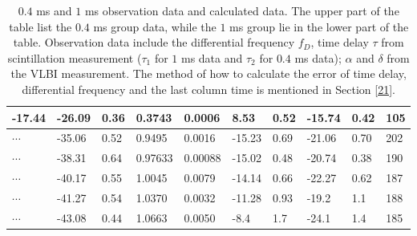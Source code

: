 \documentclass[useAMS,usenatbib]{mn2e}
\begin{document}
\begin{table}
\begin{tabular}{llllllllll}
-17.44   &-26.09                            & 0.36      & 0.3743 & 0.0006         & 8.53    & 0.52                                     & -15.74    & 0.42      &105                               
\\ \hline
$\cdots$&         -35.06                           & 0.52                               & 0.9495               & 0.0016                              & -15.23  & 0.69                                     & -21.06   & 0.70   &202                                   \\

$\cdots$ & -38.31                           & 0.64                               & 0.97633              & 0.00088                             & -15.02  & 0.48                                    & -20.74   & 0.38  &190                                    \\
$\cdots$ & -40.17                           & 0.55                               & 1.0045              & 0.0079                             & -14.14  & 0.66                                    & -22.27   & 0.62  &187                                   \\

$\cdots$ & -41.27                           & 0.54                               & 1.0370              & 0.0032                              & -11.28  & 0.93                                     & -19.2   & 1.1   &188                                   \\

$ \cdots$ & -43.08                           & 0.44                               & 1.0663              & 0.0050                              & -8.4   & 1.7                                      & -24.1   & 1.4   &185   \\
 \hline                                 
\end{tabular}
\caption{ $0.4$ ms and $1$ ms observation data and calculated data. 
The upper part of the table list the $0.4$ ms group data, while the $1$ ms group lie in the lower part of the table. 
Observation data include the differential frequency $f_D$, time delay $\tau$ from scintillation measurement ($\tau_1$ for $1$ ms data and $\tau_2$ for $0.4$ ms data); $\alpha$ and $\delta$ from the VLBI measurement. The method of how to calculate the error of time delay, differential frequency and the last column time is mentioned in Section \ref{21}.}
\label{table:apex}
\end{table}
\end{document}

